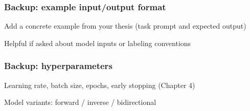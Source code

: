 
\begin{frame}
    \frametitle{Backup: example input/output format}
    \begin{PraesentationAufzaehlung}
        \item Add a concrete example from your thesis (task prompt and expected output)
        \item Helpful if asked about model inputs or labeling conventions
    \end{PraesentationAufzaehlung}
\end{frame}

\begin{frame}
    \frametitle{Backup: hyperparameters}
    \begin{PraesentationAufzaehlung}
        \item Learning rate, batch size, epochs, early stopping (Chapter 4)
        \item Model variants: forward / inverse / bidirectional
    \end{PraesentationAufzaehlung}
\end{frame}
